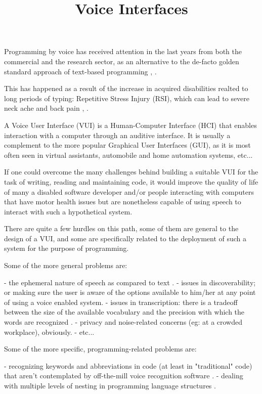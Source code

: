 
\title{Voice Interfaces}

Programming by voice has received attention in the last years from both the commercial and the research sector, as an alternative to the de-facto golden standard approach of text-based programming \cite{lagergren2021programming}, 
\cite{arnold2000programming}.

This has happened as a result of the increase in acquired disabilities realted to long periods of typing: Repetitive Stress Injury (RSI), which can lead to severe neck ache and back pain \cite{lagergren2021programming}, \cite{arnold2000programming}.

A Voice User Interface (VUI) is a Human-Computer Interface (HCI) that enables interaction with a computer through an auditive interface. It is usually a complement to the more popular Graphical User Interfaces (GUI), as it is most often seen in virtual assistants, automobile and home automation systems, etc...

If one could overcome the many challenges behind building a suitable VUI for the task of writing, reading and maintaining code, it would improve the quality of life of many a disabled software developer and/or people interacting with computers that have motor health issues but are nonetheless capable of using speech to interact with such a hypothetical system.

There are quite a few hurdles on this path, some of them are general to the design of a VUI, and some are specifically related to the deployment of such a system for the purpose of programming.

Some of the more general problems are:


- the ephemeral nature of speech as compared to text \cite{farinazzo2010empirical}.
- issues in discoverability; or making sure the user is aware of the options available to him/her at any point of using a voice enabled system.
- issues in transcription: there is a tradeoff between the size of the available vocabulary and the precision with which the words are recognized \cite{farinazzo2010empirical}.
- privacy and noise-related concerns (eg: at a crowded workplace), obviously.
- etc...

Some of the more specific, programming-related problems are:

- recognizing keywords and abbreviations in code (at least in "traditional" code) that aren't contemplated by off-the-mill voice recognition software \cite{arnold2000programming}.
- dealing with multiple levels of nesting in programming language structures \cite{arnold2000programming}.

